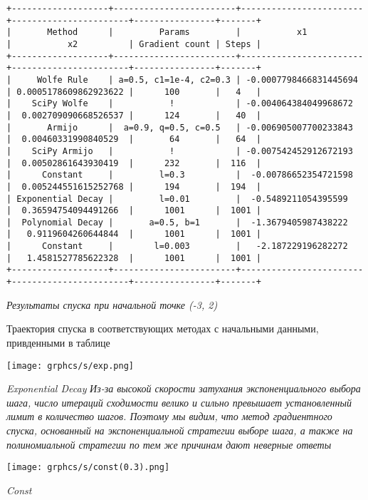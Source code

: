 \documentclass{article}
\begin{document}
\begin{center}
{ \scriptsize
\begin{verbatim}
+-------------------+------------------------+------------------------+-----------------------+----------------+-------+
|       Method      |         Params         |           x1           |           x2          | Gradient count | Steps |
+-------------------+------------------------+------------------------+-----------------------+----------------+-------+
|     Wolfe Rule    | a=0.5, c1=1e-4, c2=0.3 | -0.0007798466831445694 | 0.0005178609862923622 |      100       |   4   |
|    SciPy Wolfe    |           !            | -0.004064384049968672  |  0.002709090668526537 |      124       |   40  |
|       Armijo      |  a=0.9, q=0.5, c=0.5   | -0.006905007700233843  |  0.00460331990840529  |       64       |   64  |
|    SciPy Armijo   |           !            | -0.007542452912672193  |  0.00502861643930419  |      232       |  116  |
|      Constant     |         l=0.3          |  -0.00786652354721598  |  0.005244551615252768 |      194       |  194  |
| Exponential Decay |         l=0.01         |  -0.5489211054395599   |  0.36594754094491266  |      1001      |  1001 |
|  Polynomial Decay |       a=0.5, b=1       |  -1.3679405987438222   |   0.9119604260644844  |      1001      |  1001 |
|      Constant     |        l=0.003         |   -2.187229196282272   |   1.4581527785622328  |      1001      |  1001 |
+-------------------+------------------------+------------------------+-----------------------+----------------+-------+
\end{verbatim}
}
{ \it Результаты спуска при начальной точке (-3, 2)}
\end{center}


Траектория спуска в соответствующих методах с начальными данными, привденными в таблице

\begin{center}
    \texttt{[image: grphcs/s/exp.png]}

    { \it Exponential Decay}
    { \it Из-за высокой скорости затухания экспоненциального выбора шага, число итераций сходимости велико и сильно превышает установленный лимит в количество шагов. Поэтому мы видим, что метод градиентного спуска, основанный на экспоненциальной стратегии выборе шага, а также на полиномиальной стратегии по тем же причинам дают неверные ответы}
\end{center}

\begin{center}
    \texttt{[image: grphcs/s/const(0.3).png]}

    { \it Const}
\end{center}
\end{document}
